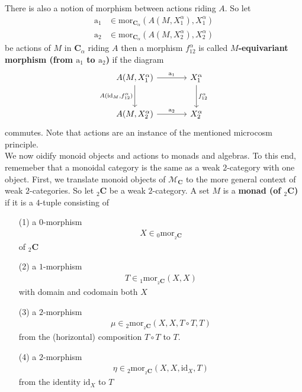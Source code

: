 There is also a notion of morphism between actions riding $A$. So let
\begin{align*}
  \mathrm{a}_{1}
  &\in
  \mathrm{mor}_{\mathbf{C}_{\alpha}}
  \left(
    A(M,X_{1}^{\alpha}),
    X_{1}^{\alpha}
  \right)
  \\
  \mathrm{a}_{2}
  &\in
  \mathrm{mor}_{\mathbf{C}_{\alpha}}
  \left(
    A(M,X_{2}^{\alpha}),
    X_{2}^{\alpha}
  \right)
\end{align*}
be actions of $M$ in $\mathbf{C}_{\alpha}$ riding $A$ then a morphism $f_{12}^{\alpha}$ is called \textbf{$M$-equivariant morphism (from $\mathrm{a}_{1}$ to $\mathrm{a}_{2}$)} if the diagram
\[
\begin{tikzcd}[sep=large]
  A(M,X_{1}^{\alpha})
  \arrow{r}{\mathrm{a}_{1}}
  \arrow[swap]{d}{A(\mathrm{id}_{M},f_{12}^{\alpha})}
  &
  X_{1}^{\alpha}
  \arrow{d}{f_{12}^{\alpha}}
  \\
  A(M,X_{2}^{\alpha})
  \arrow{r}{\mathrm{a}_{2}}
  &
  X_{2}^{\alpha}
\end{tikzcd}
\]
commutes. Note that actions are an instance of the mentioned microcosm principle.
\\
We now oidify monoid objects and actions to monads and algebras. To this end, rememeber that a monoidal category is the same as a weak $2$-category with one object. First, we translate monoid objects of $\mathcal{M}_{\mathbf{C}}$ to the more general context of weak $2$-categories. So let ${}_{2}\mathbf{C}$ be a weak $2$-category. A set $M$ is a \textbf{monad (of ${}_{2}\mathbf{C}$)} if it is a $4$-tuple consisting of
\begin{enumerate}
\item[(1)]
a $0$-morphism
\begin{align*}
  X
  \in
  {}_{0}\mathrm{mor}_{{}_{2}\mathbf{C}}
\end{align*}
of ${}_{2}\mathbf{C}$
\item[(2)]
a $1$-morphism
\begin{align*}
  T
  \in
  {}_{1}\mathrm{mor}_{{}_{2}\mathbf{C}}(X,X)
\end{align*}
with domain and codomain both $X$
\item[(3)]
a $2$-morphism
\begin{align*}
  \mu
  \in
  {}_{2}\mathrm{mor}_{{}_{2}\mathbf{C}}
  \left(
    X,
    X,
    T
    \circ
    T,
    T
  \right)
\end{align*}
from the (horizontal) composition $T \circ T$ to $T$.
\item[(4)]
a $2$-morphism
\begin{align*}
  \eta
  \in
  {}_{2}\mathrm{mor}_{{}_{2}\mathbf{C}}(X,X,\mathrm{id}_{X},T)
\end{align*}
from the identity $\mathrm{id}_{X}$ to $T$
\end{enumerate}

